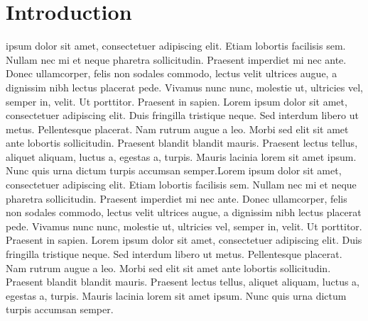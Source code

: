 \documentclass[journal]{IEEEtran}
\begin{document}
%
\IEEEpeerreviewmaketitle



\section{Introduction}
% 
% 
% 
% 
 ipsum dolor sit amet, consectetuer adipiscing elit. Etiam lobortis facilisis sem. 
Nullam nec mi et neque pharetra sollicitudin. Praesent imperdiet mi nec ante. Donec ullamcorper, felis 
non sodales commodo, lectus velit ultrices augue, a dignissim nibh lectus placerat pede. Vivamus nunc nunc, 
molestie ut, ultricies vel, semper in, velit. Ut porttitor. Praesent in sapien. Lorem ipsum dolor sit amet,
consectetuer adipiscing elit. Duis fringilla tristique neque. Sed interdum libero ut metus. Pellentesque 
placerat. Nam rutrum augue a leo. Morbi sed elit sit amet ante lobortis sollicitudin. Praesent blandit 
blandit mauris. Praesent lectus tellus, aliquet aliquam, luctus a, egestas a, turpis. Mauris lacinia 
lorem sit amet ipsum. Nunc quis urna dictum turpis accumsan semper.Lorem ipsum dolor sit amet, consectetuer 
adipiscing elit. Etiam lobortis facilisis sem. Nullam nec mi et neque pharetra sollicitudin. Praesent imperdiet 
mi nec ante. Donec ullamcorper, felis non sodales commodo, lectus velit ultrices augue, a dignissim nibh lectus 
placerat pede. Vivamus nunc nunc, molestie ut, ultricies vel, semper in, velit. Ut porttitor. Praesent in sapien. 
Lorem ipsum dolor sit amet, consectetuer adipiscing elit.
Duis fringilla tristique neque. Sed interdum libero ut metus. Pellentesque placerat. Nam rutrum augue a leo.
Morbi sed elit sit amet ante lobortis sollicitudin. Praesent blandit blandit mauris. Praesent lectus tellus,
aliquet aliquam, luctus a, egestas a, turpis. Mauris lacinia lorem sit amet ipsum. Nunc quis urna dictum
turpis accumsan semper.
\end{document}
